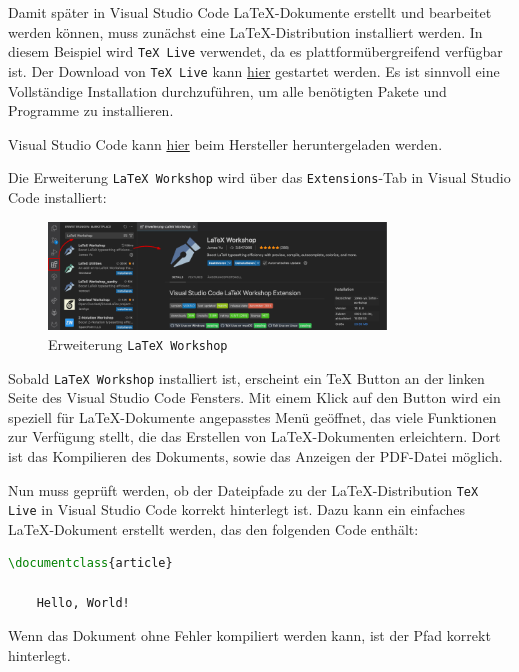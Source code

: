 Damit später in Visual Studio Code \LaTeX{}-Dokumente erstellt und bearbeitet werden können, muss zunächst eine \LaTeX{}-Distribution installiert werden. In diesem Beispiel wird \texttt{TeX Live} verwendet, da es plattformübergreifend verfügbar ist. Der Download von \texttt{TeX Live} kann \href{https://www.tug.org/texlive/}{hier} gestartet werden. Es ist sinnvoll eine Vollständige Installation durchzuführen, um alle benötigten Pakete und Programme zu installieren.

Visual Studio Code kann \href{https://code.visualstudio.com/Download}{hier} beim Hersteller heruntergeladen werden.

Die Erweiterung \texttt{LaTeX Workshop} wird über das \texttt{Extensions}-Tab in Visual Studio Code installiert:

\begin{figure}[H]
    \centering
    \includegraphics[width=0.8\textwidth]{anlagen/bilder/Latex_Workshop_Ext.pdf}
    \caption{Erweiterung \texttt{LaTeX Workshop}}
    \label{fig:visual_studio_code_latex_workshop}
\end{figure}

Sobald \texttt{LaTeX Workshop} installiert ist, erscheint ein \TeX{} Button an der linken Seite des Visual Studio Code Fensters. Mit einem Klick auf den Button wird ein speziell für \LaTeX{}-Dokumente angepasstes Menü geöffnet, das viele Funktionen zur Verfügung stellt, die das Erstellen von \LaTeX{}-Dokumenten erleichtern. Dort ist das Kompilieren des Dokuments, sowie das Anzeigen der PDF-Datei möglich.

Nun muss geprüft werden, ob der Dateipfade zu der \LaTeX{}-Distribution \texttt{TeX Live} in Visual Studio Code korrekt hinterlegt ist.
Dazu kann ein einfaches \LaTeX{}-Dokument erstellt werden, das den folgenden Code enthält:

\begin{minipage}{0.5\textwidth}
    \begin{lstlisting}[language=TeX]
\documentclass{article}

    Hello, World!

\end{lstlisting}
\end{minipage}
\hfill
\parbox[b]{0.45\textwidth}{Wenn das Dokument ohne Fehler kompiliert werden kann, ist der Pfad korrekt hinterlegt.}

